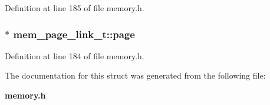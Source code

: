 Definition at line 185 of file memory.h.
\subsubsection[{page}]{$\ast$ {\bf mem\_\-page\_\-link\_\-t::page}}\label{structmem__page__link__t_eb421a583853e88a96aeee9c8cfcfb3c}




Definition at line 184 of file memory.h.

The documentation for this struct was generated from the following file:\begin{CompactItemize}
\item 
{\bf memory.h}\end{CompactItemize}
